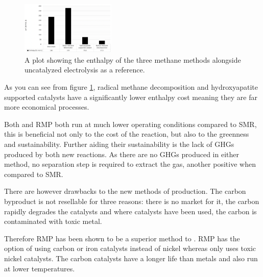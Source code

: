 \begin{figure}[H]
	\centering
	\includegraphics[width=0.4\textwidth]{6b76c760-2cb9-11eb-895f-8c8590753a48.png}
	\caption{A plot showing the enthalpy of the three methane methods alongside uncatalyzed electrolysis as a reference.\cite{SBN2020,Ashok,Saxena2011}}
	\label{fig:ME_disc}
\end{figure}

As you can see from figure \ref{fig:ME_disc}, radical methane decomposition and hydroxyapatite supported  catalysts have a significantly lower enthalpy cost meaning they are far more economical processes.

Both  and RMP both run at much lower operating conditions compared to SMR, this is beneficial not only to the cost of the reaction, but also to the greenness and sustainability.
Further aiding their sustainability is the lack of GHGs produced by both new reactions.
As there are no GHGs produced in either method, no separation step is required to extract the  gas, another positive when compared to SMR.

There are however drawbacks to the new methods of production.
The carbon byproduct is not resellable for three reasons: there is no market for it, the carbon rapidly degrades the catalysts and where  catalysts have been used, the carbon is contaminated with toxic metal.

Therefore RMP has been shown to be a superior method to .
RMP has the option of using carbon or iron catalysts instead of nickel whereas  only uses toxic nickel catalysts.
The carbon catalysts have a longer life than metals and also run at lower temperatures.
